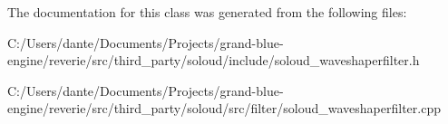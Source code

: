 The documentation for this class was generated from the following files\+:\begin{DoxyCompactItemize}
\item 
C\+:/\+Users/dante/\+Documents/\+Projects/grand-\/blue-\/engine/reverie/src/third\+\_\+party/soloud/include/soloud\+\_\+waveshaperfilter.\+h\item 
C\+:/\+Users/dante/\+Documents/\+Projects/grand-\/blue-\/engine/reverie/src/third\+\_\+party/soloud/src/filter/soloud\+\_\+waveshaperfilter.\+cpp\end{DoxyCompactItemize}
